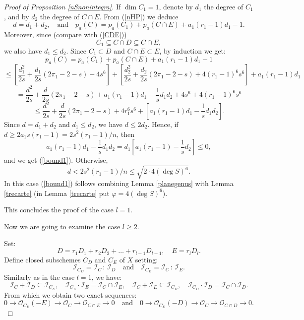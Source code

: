 \documentclass[9pt,a4paper]{amsart}
\theoremstyle{plain}
\theoremstyle{definition}
\theoremstyle{remark}
\begin{document}
\begin{proof}[Proof of Proposition \ref{nSnonintegra}]
If $\dim C_1=1$, denote by $d_1$ the degree of $C_1$, and by $d_2$
the degree of $C\cap E$. From (\ref{nHP}) we deduce
\begin{equation}\label{consHP}
d=d_1+d_2,\quad {\text{and}}\quad p_a(C)=p_a(C_1)+p_a(C\cap
E)+a_1(r_1-1)d_1-1.
\end{equation}
Moreover, since (compare with (\ref{CDE}))
$$
C_1\subseteq C\cap D\subseteq C\cap E,
$$
we also have $d_1\leq d_2$. Since $C_1\subset D$ and $C\cap E\subset
E$, by induction we get:
$$
p_a(C)=p_a(C_1)+p_a(C\cap E)+a_1(r_1-1)d_1-1
$$
$$
\leq\left[\frac{d_1^2}{2s}+\frac{d_1}{2s}(2\pi_1-2-s)+4s^6\right]+
\left[\frac{d_2^2}{2s}+\frac{d_2}{2s}(2\pi_1-2-s)+4(r_1-1)^6s^6\right]+a_1(r_1-1)d_1
$$
$$
=
\frac{d^2}{2s}+\frac{d}{2s}(2\pi_1-2-s)+a_1(r_1-1)d_1-\frac{1}{s}d_1d_2+4s^6+4(r_1-1)^6s^6
$$
$$
\leq
\frac{d^2}{2s}+\frac{d}{2s}(2\pi_1-2-s)+4r_1^6s^6+\left[a_1(r_1-1)d_1-\frac{1}{s}d_1d_2\right].
$$
Since $d=d_1+d_2$ and $d_1\leq d_2$, we have $d\leq 2d_2$. Hence, if
$d\geq 2a_1s(r_1-1)=2s^2(r_1-1)/n$, then
$$
a_1(r_1-1)d_1-\frac{1}{s}d_1d_2=d_1\left[a_1(r_1-1)-\frac{1}{s}d_2\right]\leq 0,
$$
and we get (\ref{bound1}). Otherwise, $$d< 2s^2(r_1-1)/n\leq
\sqrt{2\cdot 4(\deg S)^6}.$$ In this case (\ref{bound1}) follows
combining Lemma \ref{planegenus} with Lemma \ref{trecarte} (in
Lemma \ref{trecarte} put $\varphi= 4(\deg S)^6$).

\smallskip
This concludes the proof of the case $l=1$.

\smallskip
Now we are going to examine the case $l\geq 2$.

\smallskip
Set:
$$
D=r_1D_1+ r_2D_2+\dots+ r_{l-1}D_{l-1}, \quad E=r_lD_l.
$$
Define closed subschemes $C_D$ and $C_E$ of $X$ setting:
$$
\mathcal I_{C_D}=\mathcal I_C\,:\,\mathcal I_D \quad
{\text{and}}\quad \mathcal I_{C_E}=\mathcal I_C\,:\,\mathcal I_E.
$$
Similarly as in the case $l=1$, we have:
\begin{equation}\label{ideals}
\mathcal I_C+\mathcal I_D\subseteq \mathcal I_{C_E},\quad \mathcal
I_{C_E}\cdot\mathcal I_E={\mathcal I_{C}\cap\mathcal I_E},\quad
\mathcal I_C+\mathcal I_E\subseteq \mathcal I_{C_D},\quad \mathcal
I_{C_D}\cdot\mathcal I_D={\mathcal I_{C}\cap\mathcal I_D}.
\end{equation}
From which we obtain two exact sequences:
\begin{equation}\label{nsuccexact}
0\to \mathcal O_{C_E}(-E)\to \mathcal O_C\to \mathcal O_{C\cap E}\to
0\quad{\text{and}}\quad 0\to \mathcal O_{C_D}(-D)\to \mathcal O_C\to
\mathcal O_{C\cap D}\to 0.
\end{equation}


\end{proof}
\end{document}
